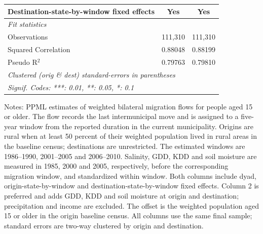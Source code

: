 \begin{table}[htbp]
\begin{tabular}{lcc}
      Destination-state-by-window fixed effects                 & Yes      & Yes\\  
      \midrule
      \emph{Fit statistics}\\
      Observations                     & 111,310  & 111,310\\  
      Squared Correlation              & 0.88048  & 0.88199\\  
      Pseudo R$^2$                     & 0.79763  & 0.79810\\  
      \midrule \midrule
      \multicolumn{3}{l}{\emph{Clustered (orig \& dest) standard-errors in parentheses}}\\
      \multicolumn{3}{l}{\emph{Signif. Codes: ***: 0.01, **: 0.05, *: 0.1}}\\
   \end{tabular}
   
   \par \raggedright 
   Notes: PPML estimates of weighted bilateral migration flows for people aged 15 or older. The flow records the last intermunicipal move and is assigned to a five-year window from the reported duration in the current municipality. Origins are rural when at least 50 percent of their weighted population lived in rural areas in the baseline census; destinations are unrestricted. The estimated windows are 1986--1990, 2001--2005 and 2006--2010. Salinity, GDD, KDD and soil moisture are measured in 1985, 2000 and 2005, respectively, before the corresponding migration window, and standardized within window. Both columns include dyad, origin-state-by-window and destination-state-by-window fixed effects. Column 2 is preferred and adds GDD, KDD and soil moisture at origin and destination; precipitation and income are excluded. The offset is the weighted population aged 15 or older in the origin baseline census. All columns use the same final sample; standard errors are two-way clustered by origin and destination.
\end{table}


